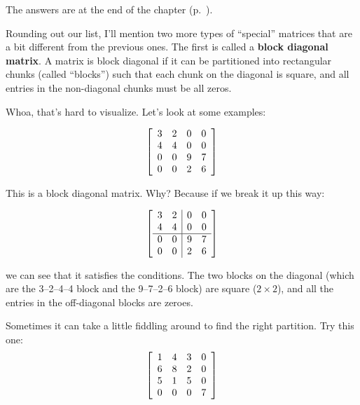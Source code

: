 The answers are at the end of the chapter (p.~\pageref{specialMatrixQuizSols}).

\bigskip


Rounding out our list, I'll mention two more types of ``special'' matrices that
are a bit different from the previous ones. The first is called a \textbf{block
diagonal matrix}. A matrix is block diagonal if it can be partitioned into
rectangular chunks (called ``blocks'') such that each chunk on the diagonal is
square, and all entries in the non-diagonal chunks must be all zeros.

Whoa, that's hard to visualize. Let's look at some examples:

\vspace{-.15in}
\begin{align*}
\mleft[
\begin{array}{cccc}
3 & 2 & 0 & 0\\
4 & 4 & 0 & 0\\
0 & 0 & 9 & 7 \\
0 & 0 & 2 & 6 \\
\end{array}
\mright]
\end{align*}
\vspace{-.15in}

This is a block diagonal matrix. Why? Because if we break it up this way:

\vspace{-.15in}
\begin{align*}
\mleft[
\begin{array}{cc|cc}
3 & 2 & 0 & 0\\
4 & 4 & 0 & 0\\
\hline
0 & 0 & 9 & 7 \\
0 & 0 & 2 & 6 \\
\end{array}
\mright]
\end{align*}
\vspace{-.15in}

we can see that it satisfies the conditions. The two blocks on the diagonal
(which are the 3--2--4--4 block and the 9--7--2--6 block) are square ($2\times
2$), and all the entries in the off-diagonal blocks are zeroes.

Sometimes it can take a little fiddling around to find the right partition. Try
this one:
\pagebreak
\begin{align*}
\mleft[
\begin{array}{cccc}
1 & 4 & 3 & 0\\
6 & 8 & 2 & 0\\
5 & 1 & 5 & 0 \\
0 & 0 & 0 & 7 \\
\end{array}
\mright]
\end{align*}
\vspace{-.15in}

